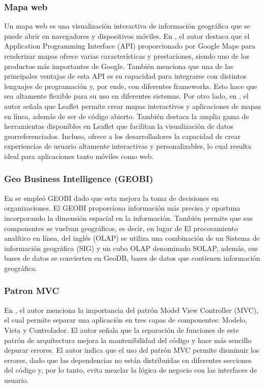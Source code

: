 \subsubsection{Mapa web}
Un mapa web es una visualización interactiva de información geográfica que se puede abrir en navegadores y dispositivos móviles.
En \cite{botto-tobarAppliedTechnologiesSecond2021}, el autor destaca que el Application Programming Interface (API) proporcionado por Google Maps para renderizar
mapas ofrece varias características y prestaciones, siendo uno de los productos más importantes de Google. También menciona que
una de las principales ventajas de esta API es su capacidad para integrarse con distintos lenguajes de programación y, por ende,
con diferentes frameworks. Esto hace que sea altamente flexible para su uso en diferentes sistemas. Por otro lado, en
\cite{cantilloAplicativoMovilPara}, el autor señala que Leaflet permite crear mapas interactivos y aplicaciones de
mapas en línea, además de ser de código abierto. También destaca la amplia gama de herramientas disponibles en Leaflet que
facilitan la visualización de datos georreferenciados. Incluso, ofrece a los desarrolladores la capacidad de crear experiencias
de usuario altamente interactivas y personalizables, lo cual resulta ideal para aplicaciones tanto móviles como web.

\subsubsection{Geo Business Intelligence (GEOBI)}
En \cite{herreraGeoBIBigVGI2015} se empleó GEOBI dado que esta mejora la toma de decisiones en organizaciones. El
GEOBI proporciona información más precisa y oportuna incorporando la dimensión espacial en la información. También
permite que sus componentes se vuelvan geográficos, es decir, en lugar de El procesamiento analítico en línea, del inglés
(OLAP) se utiliza una combinación de un Sistema de información geográfica (SIG) y un cubo OLAP denominado SOLAP, además,
sus bases de datos se convierten en GeoDB, bases de datos que contienen información geográfica.

\subsubsection{Patron MVC}
En \cite{lesanoperezAplicativoMovilGeoubicacion2022}, el autor menciona la importancia del patrón Model View Controller
(MVC), el cual permite separar una aplicación en tres capas de componentes: Modelo, Vista y Controlador. El autor señala que
la separación de funciones de este patrón de arquitectura mejora la mantenibilidad del código y hace más sencillo depurar
errores. El autor indica que el uso del patrón MVC permite disminuir los errores, dado que las dependencias no están
distribuidas en diferentes secciones del código y, por lo tanto, evita mezclar la lógica de negocio con las interfaces
de usuario.

